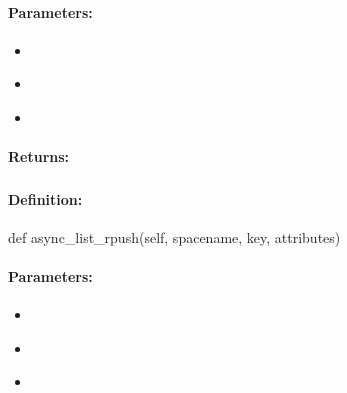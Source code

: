 \paragraph{Parameters:}
\begin{itemize}[noitemsep]
\item {}\\

\item {}\\

\item {}\\

\end{itemize}

\paragraph{Returns:}


\pagebreak
\subsubsection{}
\label{api:python:async_list_rpush}


\paragraph{Definition:}
\begin{pythoncode}
def async_list_rpush(self, spacename, key, attributes)
\end{pythoncode}

\paragraph{Parameters:}
\begin{itemize}[noitemsep]
\item {}\\

\item {}\\

\item {}\\

\end{itemize}

